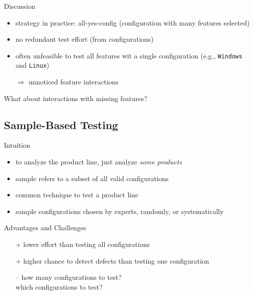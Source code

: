 \begin{frame}[b]{\myframetitle{}}
\begin{mycolumns}[b]
\begin{note}{Discussion}
\begin{itemize}
				\item strategy in practice: all-yes-config (configuration with many features selected)
				\item no redundant test effort (from configurations)
				\vspace*{1ex}
				\item often unfeasible to test all features wit a single configuration (e.g., \texttt{Windows} and \texttt{Linux})
				\item[$\Rightarrow$] unnoticed feature interactions\mysource{\lectureinteractions}
			\end{itemize}
		\end{note}
		\pause
		\begin{example}{What about interactions with missing features?}
			\centering{}
		\end{example}
	\end{mycolumns}
\end{frame}

\subsection{Sample-Based Testing}
\begin{frame}{\myframetitle{} }
	\begin{mycolumns}
		\begin{definition}{Intuition}
			\begin{itemize}
				\item to analyze the product line, just analyze \emph{some products}
				\item sample  refers to a subset of all valid configurations
				\item common technique to test a product line
				\item sample configurations chosen by experts, randomly, or systematically
			\end{itemize}
		\end{definition}
		\pause
		\begin{note}{Advantages and Challenges}
			\begin{itemize}
				\item[+] lower effort than testing all configurations
				\item[+] higher chance to detect defects than testing one configuration
				\item[--] how many configurations to test?\\which configurations to test?
			\end{itemize}
		\end{note}
	\mynextcolumn
		\pause
	\end{mycolumns}
\end{frame}

